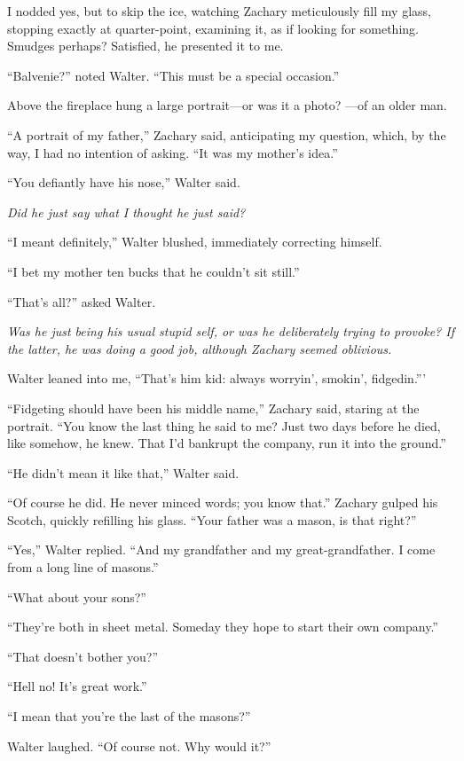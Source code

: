 I nodded yes, but to skip the ice, watching Zachary meticulously fill my
glass, stopping exactly at quarter-point, examining it, as if looking
for something. Smudges perhaps? Satisfied, he presented it to me.

``Balvenie?'' noted Walter. ``This must be a special occasion.''

Above the fireplace hung a large portrait---or was it a photo? ---of an
older man.

``A portrait of my father,'' Zachary said, anticipating my question,
which, by the way, I had no intention of asking. ``It was my mother's
idea.''

``You defiantly have his nose,'' Walter said.

\emph{Did he just say what I thought he just said?}

``I meant definitely,'' Walter blushed, immediately correcting himself.

``I bet my mother ten bucks that he couldn't sit still.''

``That's all?'' asked Walter.

\emph{Was he just being his usual stupid self, or was he deliberately
trying to provoke? If the latter, he was doing a good job,}
\emph{although Zachary seemed oblivious.}

Walter leaned into me, ``That's him kid: always worryin', smokin',
fidgedin.'''

``Fidgeting should have been his middle name,'' Zachary said, staring at
the portrait. ``You know the last thing he said to me? Just two days
before he died, like somehow, he knew. That I'd bankrupt the company,
run it into the ground.''

``He didn't mean it like that,'' Walter said.

``Of course he did. He never minced words; you know that.'' Zachary
gulped his Scotch, quickly refilling his glass. ``Your father was a
mason, is that right?''

``Yes,'' Walter replied. ``And my grandfather and my great-grandfather.
I come from a long line of masons.''

``What about your sons?''

``They're both in sheet metal. Someday they hope to start their own
company.''

``That doesn't bother you?''

``Hell no! It's great work.''

``I mean that you're the last of the masons?''

Walter laughed. ``Of course not. Why would it?''

